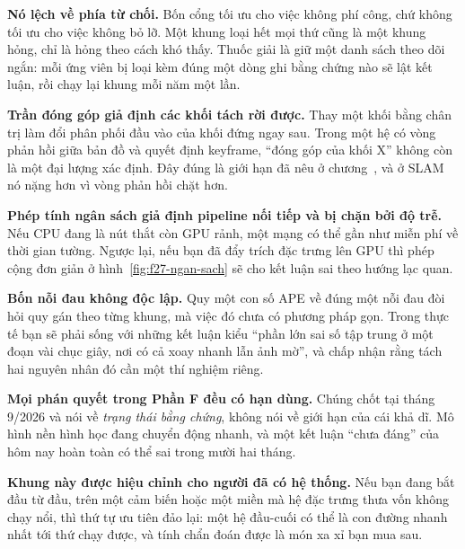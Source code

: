 \documentclass[../../deep_learning.tex]{subfiles}
\begin{document}
\textbf{Nó lệch về phía từ chối.} Bốn cổng tối ưu cho việc không phí công, chứ không tối ưu cho việc không bỏ lỡ. Một khung loại hết mọi thứ cũng là một khung hỏng, chỉ là hỏng theo cách khó thấy. Thuốc giải là giữ một danh sách theo dõi ngắn: mỗi ứng viên bị loại kèm đúng một dòng ghi bằng chứng nào sẽ lật kết luận, rồi chạy lại khung mỗi năm một lần.

\textbf{Trần đóng góp giả định các khối tách rời được.} Thay một khối bằng chân trị làm đổi phân phối đầu vào của khối đứng ngay sau. Trong một hệ có vòng phản hồi giữa bản đồ và quyết định keyframe, ``đóng góp của khối X'' không còn là một đại lượng xác định. Đây đúng là giới hạn đã nêu ở chương~, và ở SLAM nó nặng hơn vì vòng phản hồi chặt hơn.

\textbf{Phép tính ngân sách giả định pipeline nối tiếp và bị chặn bởi độ trễ.} Nếu CPU đang là nút thắt còn GPU rảnh, một mạng có thể gần như miễn phí về thời gian tường. Ngược lại, nếu bạn đã đẩy trích đặc trưng lên GPU thì phép cộng đơn giản ở hình~\ref{fig:f27-ngan-sach} sẽ cho kết luận sai theo hướng lạc quan.

\textbf{Bốn nỗi đau không độc lập.} Quy một con số APE về đúng một nỗi đau đòi hỏi quy gán theo từng khung, mà việc đó chưa có phương pháp gọn. Trong thực tế bạn sẽ phải sống với những kết luận kiểu ``phần lớn sai số tập trung ở một đoạn vài chục giây, nơi có cả xoay nhanh lẫn ảnh mờ'', và chấp nhận rằng tách hai nguyên nhân đó cần một thí nghiệm riêng.

\textbf{Mọi phán quyết trong Phần F đều có hạn dùng.} Chúng chốt tại tháng 9/2026 và nói về \emph{trạng thái bằng chứng}, không nói về giới hạn của cái khả dĩ. Mô hình nền hình học đang chuyển động nhanh, và một kết luận ``chưa đáng'' của hôm nay hoàn toàn có thể sai trong mười hai tháng.

\textbf{Khung này được hiệu chỉnh cho người đã có hệ thống.} Nếu bạn đang bắt đầu từ đầu, trên một cảm biến hoặc một miền mà hệ đặc trưng thưa vốn không chạy nổi, thì thứ tự ưu tiên đảo lại: một hệ đầu-cuối có thể là con đường nhanh nhất tới thứ chạy được, và tính chẩn đoán được là món xa xỉ bạn mua sau.
\end{document}
